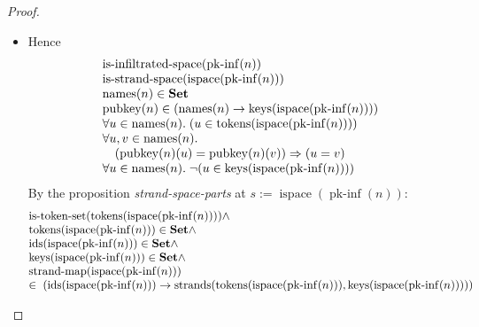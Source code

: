 \documentclass[11pt]{article}
\theoremstyle{plain}
\begin{document}
\begin{proof}
\begin{itemize}[leftmargin=2.8em, itemsep=4pt, parsep=1pt]
  \item[\textbf{17--23}] Hence 
\begin{equation*}
\begin{array}{@{}l@{}}
\operatorname{is\text{-}infiltrated\text{-}space}(\operatorname{pk\text{-}inf}(n)) \\
\operatorname{is\text{-}strand\text{-}space}(\operatorname{ispace}(\operatorname{pk\text{-}inf}(n))) \\
\operatorname{names}(n) \in \mathbf{Set} \\
\operatorname{pubkey}(n) \in (\operatorname{names}(n) \to \operatorname{keys}(\operatorname{ispace}(\operatorname{pk\text{-}inf}(n)))) \\
\forall u \in \operatorname{names}(n).\; (u \in \operatorname{tokens}(\operatorname{ispace}(\operatorname{pk\text{-}inf}(n)))) \\
\begin{array}{@{}l@{}} \forall u, v \in \operatorname{names}(n). \\ \quad (\operatorname{pubkey}(n)(u) = \operatorname{pubkey}(n)(v)) \Rightarrow (u = v) \end{array} \\
\forall u \in \operatorname{names}(n).\; \neg (u \in \operatorname{keys}(\operatorname{ispace}(\operatorname{pk\text{-}inf}(n))))
\end{array}
\end{equation*}
By the proposition \emph{strand-space-parts} at $s := \operatorname{ispace}(\operatorname{pk\text{-}inf}(n))$:
\begin{equation*}
\begin{array}{@{}l@{}} \operatorname{is\text{-}token\text{-}set}(\operatorname{tokens}(\operatorname{ispace}(\operatorname{pk\text{-}inf}(n)))) \wedge \\ \operatorname{tokens}(\operatorname{ispace}(\operatorname{pk\text{-}inf}(n))) \in \mathbf{Set} \wedge \\ \operatorname{ids}(\operatorname{ispace}(\operatorname{pk\text{-}inf}(n))) \in \mathbf{Set} \wedge \\ \operatorname{keys}(\operatorname{ispace}(\operatorname{pk\text{-}inf}(n))) \in \mathbf{Set} \wedge \\ \operatorname{strand\text{-}map}(\operatorname{ispace}(\operatorname{pk\text{-}inf}(n))) \\ \in\; (\operatorname{ids}(\operatorname{ispace}(\operatorname{pk\text{-}inf}(n))) \to \operatorname{strands}(\operatorname{tokens}(\operatorname{ispace}(\operatorname{pk\text{-}inf}(n))), \operatorname{keys}(\operatorname{ispace}(\operatorname{pk\text{-}inf}(n))))) \end{array}
\end{equation*}


\end{itemize}
\end{proof}
\end{document}
